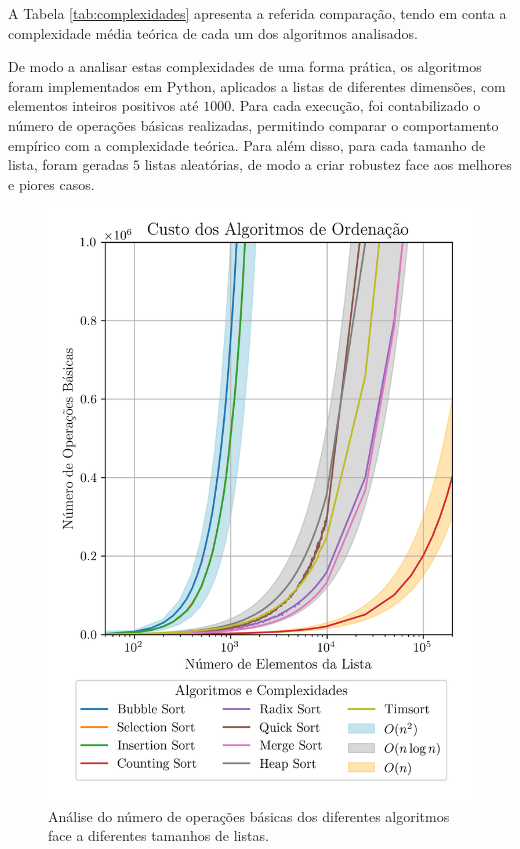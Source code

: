 \documentclass[conference]{IEEEtran}
\begin{document}
A Tabela \ref{tab:complexidades} apresenta a referida comparação, tendo em conta a complexidade média teórica de cada um dos algoritmos analisados.

De modo a analisar estas complexidades de uma forma prática, os algoritmos foram implementados em Python, aplicados a listas de diferentes dimensões, com elementos inteiros positivos até $1000$. Para cada execução, foi contabilizado o número de operações básicas realizadas, permitindo comparar o comportamento empírico com a complexidade teórica. Para além disso, para cada tamanho de lista, foram geradas $5$ listas aleatórias, de modo a criar robustez face aos melhores e piores casos.

\begin{figure}[H]
    \centering
    \includegraphics[width=1\linewidth]{sorting_complexities.png}
    \caption{Análise do número de operações básicas dos diferentes algoritmos face a diferentes tamanhos de listas.}
    \label{fig:sorting_complexities}
\end{figure}
\end{document}
